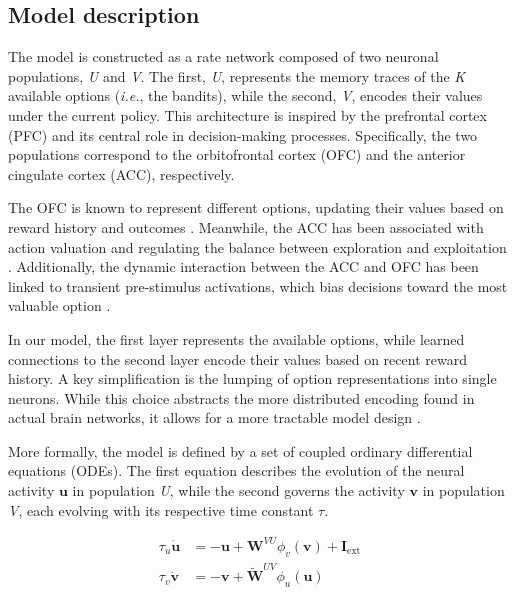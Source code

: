 
\subsection{Model description}
The model is constructed as a rate network composed of two neuronal populations, \textit{U} and \textit{V}. The first, \textit{U}, represents the memory traces of the \textit{K} available options (\textit{i.e.}, the bandits), while the second, \textit{V}, encodes their values under the current policy. This architecture is inspired by the prefrontal cortex (PFC) and its central role in decision-making processes. Specifically, the two populations correspond to the orbitofrontal cortex (OFC) and the anterior cingulate cortex (ACC), respectively.

The OFC is known to represent different options, updating their values based on reward history and outcomes \cite{lukChoiceCodingFrontal2013, kennerleyDecisionMakingReward2011a}. Meanwhile, the ACC has been associated with action valuation and regulating the balance between exploration and exploitation \cite{khamassiChapter22Medial2013}. Additionally, the dynamic interaction between the ACC and OFC has been linked to transient pre-stimulus activations, which bias decisions toward the most valuable option \cite{funahashiPrefrontalContributionDecisionMaking2017, marcosDeterminingMonkeyFree2016, balewskiValueDynamicsAffect2023}.

In our model, the first layer represents the available options, while learned connections to the second layer encode their values based on recent reward history. A key simplification is the lumping of option representations into single neurons. While this choice abstracts the more distributed encoding found in actual brain networks, it allows for a more tractable model design \cite{martinRepresentationObjectConcepts2007a}.

More formally, the model is defined by a set of coupled ordinary differential equations (ODEs). The first equation describes the evolution of the neural activity $\textbf{u}$ in population \textit{U}, while the second governs the activity $\textbf{v}$ in population \textit{V}, each evolving with its respective time constant $\tau$.

\begin{equation}
\begin{aligned}
    \tau_{u} \dot{\textbf{u}}&= -\textbf{u} + \textbf{W}^{VU}\phi_{v}(\textbf{v}) + \textbf{I}_{\text{ext}} \\
    \tau_{v} \dot{\textbf{v}}&= -\textbf{v} + \widetilde{\textbf{W}}^{UV}\phi_{u}(\textbf{u})
\end{aligned}
\end{equation}\label{eq:main}


